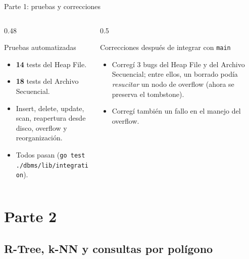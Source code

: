 \documentclass[aspectratio=169,10pt]{beamer}
\begin{document}
\begin{frame}{Parte 1: pruebas y correcciones}
  \begin{columns}[T]
    \begin{column}{0.48\textwidth}
      \begin{exampleblock}{Pruebas automatizadas}
        \small
        \begin{itemize}
          \item \textbf{14} tests del Heap File.
          \item \textbf{18} tests del Archivo Secuencial.
          \item Insert, delete, update, scan, reapertura desde disco, overflow y reorganización.
          \item Todos pasan (\texttt{go test ./dbms/lib/integration}).
        \end{itemize}
      \end{exampleblock}
    \end{column}
    \begin{column}{0.5\textwidth}
      \begin{block}{Correcciones después de integrar con \texttt{main}}
        \small
        \begin{itemize}
          \item Corregí 3 bugs del Heap File y del Archivo Secuencial; entre ellos, un borrado podía \emph{resucitar} un nodo de overflow (ahora se preserva el tombstone).
          \item Corregí también un fallo en el manejo del overflow.
        \end{itemize}
      \end{block}
    \end{column}
  \end{columns}
\end{frame}

\section{Parte 2}
\subsection{R-Tree, k-NN y consultas por polígono}
\end{document}
